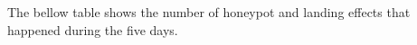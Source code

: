 The bellow table shows the number of honeypot and landing effects that happened during the five days.

\begin{table}[H]
\caption{Mobile Interactive Landing and honeypot effect}
\label{tab:landingandhonypot_mobile}
\centering
{}
\end{table}



